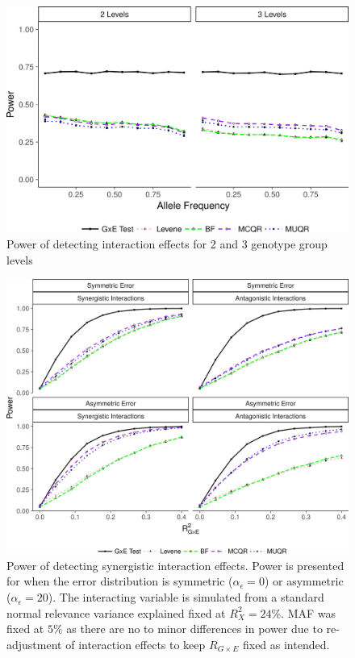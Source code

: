 \documentclass[12pt]{article}
\begin{document}
\newpage
\begin{figure}[h!]
	\centering
	\includegraphics[width=1 \textwidth, height=0.6\textwidth]{figures/power_nominal_cVar23_t.jpg}
	\caption{Power of detecting interaction effects for 2 and 3 genotype group levels}
	\label{fig:PowLevel}
\end{figure}

\newpage
\begin{figure}[h!]
	\centering
	\includegraphics[width=1 \textwidth, height=0.85\textwidth]{figures//Power_Int.jpg}
	\caption{Power of detecting synergistic interaction effects. Power is presented for when the error distribution is symmetric ($\alpha_\epsilon = 0$) or asymmetric ($\alpha_\epsilon = 20$).  The interacting variable is simulated from a standard normal relevance variance explained fixed at $R^{2}_{X}=24\%$. MAF was fixed at $5\%$ as there are no to minor differences in power due to re-adjustment of interaction effects to keep $R_{G \times E}$ fixed as intended.}
	\label{fig:Pow1}
\end{figure}
\end{document}
